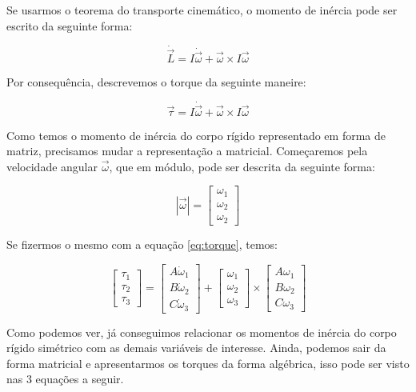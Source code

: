 Se usarmos o teorema do transporte cinemático, o momento de inércia pode ser escrito da seguinte forma:

\begin{equation}
\dot{\vec{L}}=I\dot{\vec{\omega}}+\vec{\omega}\times I \vec{\omega}
\end{equation}

Por consequência, descrevemos o torque da seguinte maneire:

\begin{equation}\label{eq:torque}
\vec{\tau}=I\dot{\vec{\omega}}+\vec{\omega}\times I \vec{\omega}
\end{equation}

Como temos o momento de inércia do corpo rígido representado em forma de matriz, precisamos mudar a representação a matricial. Começaremos pela velocidade angular $\vec{\omega}$, que em módulo, pode ser descrita da seguinte forma:

\begin{equation}
\left|\vec{\omega}\right|=\begin{bmatrix}\omega_1\\\omega_2\\\omega_2\end{bmatrix}
\end{equation}

Se fizermos o mesmo com a equação \ref{eq:torque}, temos:

\begin{equation}
\begin{bmatrix}\tau_{1}\\\tau_{2}\\\tau_{3}\end{bmatrix}=\begin{bmatrix}A\dot{\omega}_{1}\\B\dot{\omega}_{2}\\C\dot{\omega}_{3}\end{bmatrix}+\begin{bmatrix}\omega_{1}\\\omega_{2}\\\omega_{3}\end{bmatrix}\times\begin{bmatrix}A\omega_{1}\\B\omega_{2}\\C\omega_{3}\end{bmatrix}
\end{equation}

Como podemos ver, já conseguimos relacionar os momentos de inércia do corpo rígido simétrico com as demais variáveis de interesse. Ainda, podemos sair da forma matricial e apresentarmos os torques da forma algébrica, isso pode ser visto nas 3 equações a seguir.

